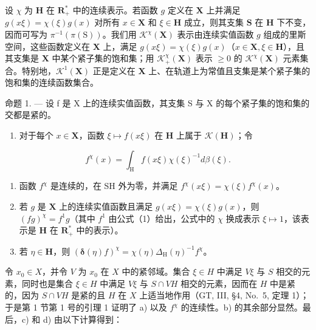 设 \(\chi\) 为 \(\mathbf{H}\) 在 \(\mathbf{R}_+^*\) 中的连续表示。若函数 \(g\) 定义在 \(\mathbf{X}\) 上并满足 \(g(x\xi) = \chi (\xi)g(x)\) 对所有 \(x\in \mathbf{X}\) 和 \(\xi \in \mathbf{H}\) 成立，则其支集 \(\mathbf{S}\) 在 \(\mathbf{H}\) 下不变，因而可写为 \(\pi^{-1} (\pi (\mathrm{S}))\)。我们用 \(\mathcal{K}^{\chi}(\mathbf{X})\) 表示由连续实值函数 \(g\) 组成的里斯空间，这些函数定义在 \(\mathbf{X}\) 上，满足 \(g(x\xi) = \chi (\xi)g(x)\)（\(x\in \mathbf{X},\xi \in \mathbf{H}\)），且其支集是 \(\mathbf{X}\) 中某个紧子集的饱和集；用 \(\mathcal{K}_+^\chi (\mathbf{X})\) 表示 \(\geqslant 0\) 的 \(\mathcal{K}^{\chi}(\mathbf{X})\) 元素集合。特别地，\(\mathcal{K}^1 (\mathbf{X})\) 正是定义在 \(\mathbf{X}\) 上、在轨道上为常值且支集是某个紧子集的饱和集的连续函数集合。

命题 1. --- 设 f 是 X 上的连续实值函数，其支集 S 与 X 的每个紧子集的饱和集的交都是紧的。

\begin{enumerate}
\def\labelenumi{\alph{enumi})}
\tightlist
\item
  对于每个 \(x \in \mathbf{X}\)，函数 \(\xi \mapsto f(x\xi)\) 在 \(\mathbf{H}\) 上属于 \(\mathcal{K}(\mathbf{H})\)；令
\end{enumerate}

\[
f ^ {\chi} (x) = \int_ {\mathrm{H}} f (x \xi) \chi (\xi) ^ {- 1} d \beta (\xi).\tag{1}
\]

\begin{enumerate}
\def\labelenumi{\alph{enumi})}
\setcounter{enumi}{1}
\item
  函数 \(f^{\chi}\) 是连续的，在 SH 外为零，并满足 \(f^{\chi}(x\xi) = \chi(\xi)f^{\chi}(x)\)。
\item
  若 \(g\) 是 \(\mathbf{X}\) 上的连续实值函数且满足 \(g(x\xi) = \chi(\xi)g(x)\)，则 \((fg)^{\chi} = f^{1}g\)（其中 \(f^{1}\) 由公式（1）给出，公式中的 \(\chi\) 换成表示 \(\xi \mapsto 1\)，该表示是 \(\mathbf{H}\) 在 \(\mathbf{R}_{+}^{*}\) 中的表示）。
\item
  若 \(\eta \in \mathbf{H}\)，则 \(\left(\pmb{\delta}(\eta)f\right)^{\chi} = \chi (\eta)\Delta_{\mathrm{H}}(\eta)^{-1}f^{\chi}\)。
\end{enumerate}

令 \(x_0 \in X\)，并令 \(V\) 为 \(x_0\) 在 \(X\) 中的紧邻域。集合 \(\xi \in H\) 中满足 \(V\xi\) 与 \(S\) 相交的元素，同时也是集合 \(\xi \in H\) 中满足 \(V\xi\) 与 \(S \cap VH\) 相交的元素，因而在 \(H\) 中是紧的，因为 \(S \cap VH\) 是紧的且 \(H\) 在 \(X\) 上适当地作用（GT, III, §4, No.~5, 定理 1）；于是第 1 节第 1 号的引理 1 证明了 a) 以及 \(f^{\chi}\) 的连续性。b) 的其余部分显然。最后，c) 和 d) 由以下计算得到：

